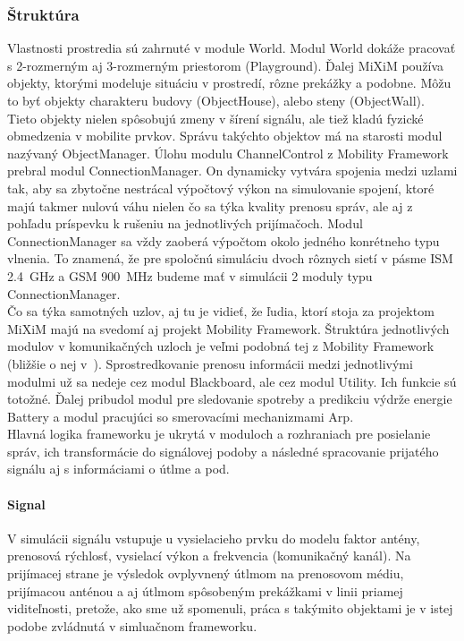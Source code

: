 \subsubsection{Štruktúra}
\indent\indent Vlastnosti prostredia sú zahrnuté v module \ttfamily World\rmfamily . Modul \ttfamily World \rmfamily dokáže pracovať s 2-rozmerným aj 3-rozmerným priestorom (\ttfamily Playground\rmfamily). Ďalej MiXiM používa objekty, ktorými modeluje situáciu v prostredí, rôzne prekážky a podobne. Môžu to byť objekty charakteru budovy (\ttfamily ObjectHouse\rmfamily), alebo steny (\ttfamily ObjectWall\rmfamily). Tieto objekty nielen spôsobujú zmeny v šírení signálu, ale tiež kladú fyzické obmedzenia v mobilite prvkov. Správu takýchto objektov má na starosti modul nazývaný \ttfamily ObjectManager\rmfamily. Úlohu modulu \ttfamily ChannelControl \rmfamily z Mobility Framework prebral modul \ttfamily ConnectionManager\rmfamily. On dynamicky vytvára spojenia medzi uzlami tak, aby sa zbytočne nestrácal výpočtový výkon na simulovanie spojení, ktoré majú takmer nulovú váhu nielen čo sa týka kvality prenosu správ, ale aj z pohľadu príspevku k rušeniu na jednotlivých prijímačoch. Modul \ttfamily ConnectionManager \rmfamily sa vždy zaoberá výpočtom okolo jedného konrétneho typu vlnenia. To znamená, že pre spoločnú simuláciu dvoch rôznych sietí v pásme ISM 2.4~GHz a GSM 900~MHz budeme mať v simulácii 2 moduly typu \ttfamily ConnectionManager\rmfamily.\\ 
\indent Čo sa týka samotných uzlov, aj tu je vidieť, že ľudia, ktorí stoja za projektom MiXiM majú na svedomí aj projekt Mobility Framework. Štruktúra jednotlivých modulov v komunikačných uzloch je veľmi podobná tej z Mobility Framework (bližšie o nej v~\cite{halas03}). Sprostredkovanie prenosu informácii medzi jednotlivými modulmi už sa nedeje cez modul \ttfamily Blackboard\rmfamily, ale cez modul \ttfamily Utility\rmfamily. Ich funkcie sú totožné. Ďalej pribudol modul pre sledovanie spotreby a predikciu výdrže energie \ttfamily Battery \rmfamily a modul pracujúci so smerovacími mechanizmami \ttfamily Arp\rmfamily.\\
\indent Hlavná logika frameworku je ukrytá v moduloch a rozhraniach pre posielanie správ, ich transformácie do signálovej podoby a následné spracovanie prijatého signálu aj s informáciami o útlme a pod.

\paragraph{Signal}
\indent V simulácii signálu vstupuje u vysielacieho prvku do modelu faktor antény, prenosová rýchlosť, vysielací výkon a frekvencia (komunikačný kanál). Na prijímacej strane je výsledok ovplyvnený útlmom na prenosovom médiu, prijímacou anténou a aj útlmom spôsobeným prekážkami v linii priamej viditeľnosti, pretože, ako sme už spomenuli, práca s takýmito objektami je v istej podobe zvládnutá v simluačnom frameworku.

